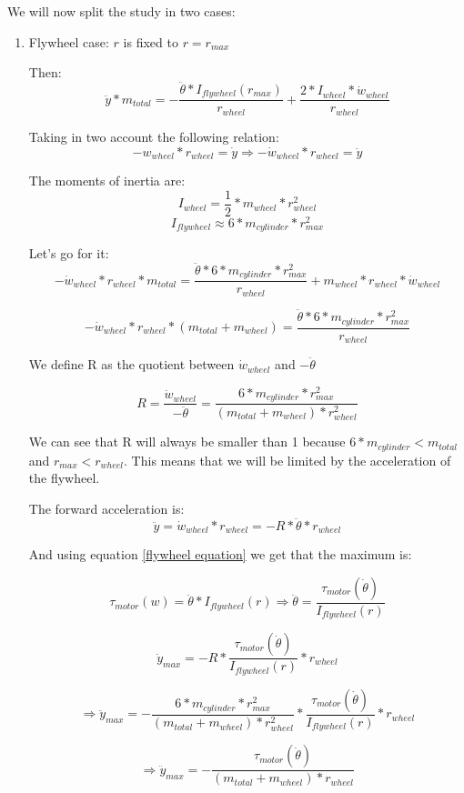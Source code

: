 We will now split the study in two cases:
\begin{enumerate}
    \item Flywheel case: $r$ is fixed to $r = r_{max}$ 
    
    Then:  
    \[\ddot{y}*m_{total} = - \frac{\ddot{\theta}*I_{flywheel}(r_{max})}{r_{wheel}} + \frac{2*I_{wheel} * \dot{w}_{wheel}}{r_{wheel}}\]

    Taking in two account the following relation:
    \[-w_{wheel} * r_{wheel} = \dot{y} \Rightarrow  -\dot{w}_{wheel} * r_{wheel} = \ddot{y} \]

    The moments of inertia are:
    \[I_{wheel} = \frac{1}{2} *m_{wheel} * r_{wheel}^2\]
    \[I_{flywheel} \approx 6 * m_{cylinder} * r_{max}^2\]

    Let's go for it:
    \[-\dot{w}_{wheel} * r_{wheel}*m_{total} = \frac{\ddot{\theta}*6 * m_{cylinder} * r_{max}^2}{r_{wheel}} + m_{wheel} * r_{wheel} * \dot{w}_{wheel} \]

    \[-\dot{w}_{wheel} * r_{wheel}*(m_{total} + m_{wheel}) = \frac{\ddot{\theta}*6 * m_{cylinder} * r_{max}^2}{r_{wheel}}\]


    We define R as the quotient between $\dot{w}_{wheel}$ and $-\ddot{\theta}$

    \[R = \frac{\dot{w}_{wheel}}{-\ddot{\theta}} = \frac{6 * m_{cylinder} * r_{max}^2}{(m_{total} + m_{wheel}) * r_{wheel}^2} \]

    We can see that R will always be smaller than 1 because $6 * m_{cylinder} < m_{total} $ and $r_{max} < r_{wheel}$. This means that we will be limited by the acceleration of the flywheel.

    The forward acceleration is:
    \[\ddot{y} = \dot{w}_{wheel} * r_{wheel} = - R * \ddot{\theta} * r_{wheel}\]

    And using equation \ref{flywheel equation} we get that the maximum is:

    \[\tau_{motor} (w) = \ddot{\theta}*I_{flywheel}(r) \Rightarrow \ddot{\theta} = \frac{\tau_{motor} (\dot{\theta})}{I_{flywheel}(r)} \]

    \[\ddot{y}_{max} = - R * \frac{\tau_{motor} (\dot{\theta})}{I_{flywheel}(r)} * r_{wheel}\]

    \[\Rightarrow \ddot{y}_{max} = -\frac{6 * m_{cylinder} * r_{max}^2}{(m_{total} + m_{wheel}) * r_{wheel}^2} * \frac{\tau_{motor} (\dot{\theta})}{I_{flywheel}(r)} * r_{wheel}\]
    
    \[\boxed{\Rightarrow \ddot{y}_{max} = -\frac{\tau_{motor} (\dot{\theta})}{(m_{total} +m_{wheel}) * r_{wheel}}} \]
    

\end{enumerate}
